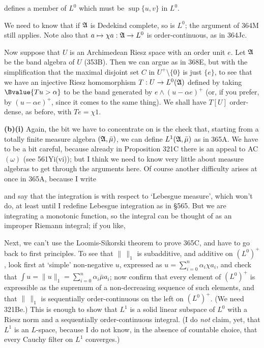 {

\noindent defines a member of $L^0$ which must be $\sup\{u,v\}$ in $L^0$.\
\Qed

We need to know that if $\frak A$ is Dedekind
complete, so is $L^0$;  the argument of 364M still applies.
Note also that $a\mapsto\chi a:\frak A\to L^0$ is
order-continuous, as in 364Jc.

\medskip

 Now suppose that $U$ is an Archimedean Riesz space with an
order unit $e$.   Let $\frak A$ be the band algebra of $U$ (353B).
Then we can argue as in 368E, but with the simplification
that the maximal disjoint set $C$ in $U^+\setminus\{0\}$ is just $\{e\}$,
to see that we have an injective Riesz homomorphism $T:U\to L^0(\frak A)$
defined by taking $\Bvalue{Tu>\alpha}$ to be the band generated by
$e\wedge(u-\alpha e)^+$ (or, if you prefer, by $(u-\alpha e)^+$, since it
comes to the same thing).   We shall have $T[U]$ order-dense, as before,
with $Te=\chi 1$.

\medskip

{\bf (b)(i)} Again, the bit we have to concentrate on is the check that,
starting from a totally finite measure algebra $(\frak A,\bar\mu)$, we can
define $L^1(\frak A,\bar\mu)$ as in 365A.
We have to be a bit careful, because already in Proposition 321C there is
an appeal to AC$(\omega)$ (see 561Yi(vi));  
but I think we need to know very little about
measure algebras to get through the arguments here.   Of course another
difficulty arises at once in 365A, because I write


\noindent and say that the integration is with respect to `Lebesgue
measure', which won't do, at least until I redefine Lebesgue integration as
in \S565.   But we are integrating a monotonic
function, so the integral can be thought of as an improper Riemann
integral;  if you like,


\noindent Next, we can't use the Loomis-Sikorski theorem to prove 365C, and
have to go back to first principles.   To see that $\|\,\|_1$ is
subadditive, and additive on $(L^0)^+$, look first at `simple' non-negative
$u$, expressed as $u=\sum_{i=0}^n\alpha_i\chi a_i$, and check that
$\int u=\|u\|_1=\sum_{i=0}^n\alpha_i\bar\mu a_i$;  now confirm that
every element of $(L^0)^+$ is expressible as the supremum of a
non-decreasing sequence of such elements, and that $\|\,\|_1$ is
sequentially order-continuous on the left on $(L^0)^+$.
(We need 321Be.)
This is enough to show that $L^1$ is a solid linear subspace of $L^0$ with
a Riesz norm and a sequentially order-continuous integral.
(I do {\it not} claim, yet, that $L^1$ is an $L$-space, because
I do not know, in the absence of countable choice, that every Cauchy
filter on $L^1$ converges.)

}
